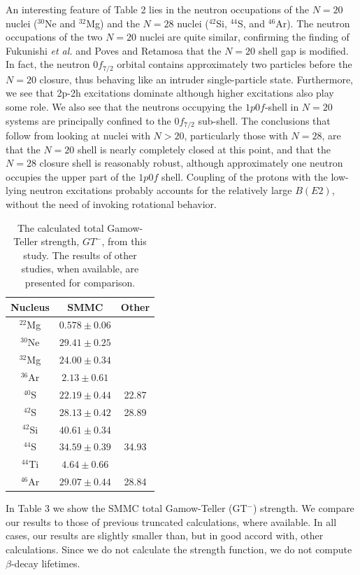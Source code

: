\documentclass{article}
\begin{document}
An interesting feature of Table 2 lies in the neutron
occupations of the $N = 20$ nuclei ($^{30}$Ne and $^{32}$Mg) and the $N =
28$ nuclei ($^{42}$Si, $^{44}$S, and $^{46}$Ar).  The neutron
occupations of the two $N = 20$ nuclei are quite similar, confirming
the finding of Fukunishi {\it et al.} \cite{r:fukunishi} and Poves and
Retamosa \cite{r:poves1} that the $N= 20$ shell gap is modified.  In
fact, the neutron $0f_{7/2}$ orbital contains approximately two
particles before the $N=20$ closure, thus behaving like an intruder
single-particle state.  Furthermore, we see that 2p-2h excitations
dominate although higher excitations also play some role.  We also see
that the neutrons occupying the $1p0f$-shell in $N=20$ systems are
principally confined to the $0f_{7/2}$ sub-shell.
The conclusions that follow from looking at nuclei with $N > 20$,
particularly those with $N = 28$, are that the $N = 20$ shell is nearly
completely closed at this point, and that the $N=28$ closure shell is
reasonably robust, although approximately one neutron occupies the upper
part of the $1p0f$ shell. Coupling of the protons with the low-lying
neutron excitations probably accounts for the relatively large
$B(E2)$, without the need of invoking rotational behavior.
\begin{table}[hbtp]
\begin{center}
\caption{The calculated total Gamow-Teller strength, $GT^-$,
from this study.  The results of other studies, when
available, are presented for comparison.
}
\begin{tabular}{|ccc|}\hline
 Nucleus & SMMC & Other \\
\hline
 $^{22}$Mg & $0.578 \pm  0.06$  & \\
 $^{30}$Ne & $29.41 \pm 0.25$ & \\
 $^{32}$Mg & $24.00 \pm 0.34$ & \\
 $^{36}$Ar & $2.13 \pm  0.61$ & \\
 $^{40}$S  & $22.19 \pm 0.44$ & 22.87 \cite{r:retamosa} \\
 $^{42}$S  & $28.13 \pm 0.42$ & 28.89 \cite{r:retamosa} \\
 $^{42}$Si & $40.61 \pm 0.34$ & \\
 $^{44}$S  & $34.59 \pm 0.39$ & 34.93 \cite{r:retamosa} \\
 $^{44}$Ti & $4.64 \pm  0.66$ & \\
 $^{46}$Ar & $29.07 \pm 0.44$ & 28.84 \cite{r:retamosa} \\\hline
\end{tabular}
\end{center}
\label{t:tab4}
\end{table}
In Table 3 we show the SMMC total Gamow-Teller (GT$^-$)
strength.  We compare our results to those of previous truncated
calculations, where available.  In all cases, our results are slightly
smaller than, but in good accord with, other calculations.  Since we
do not calculate the strength function, we do not compute
$\beta$-decay lifetimes.
\end{document}
